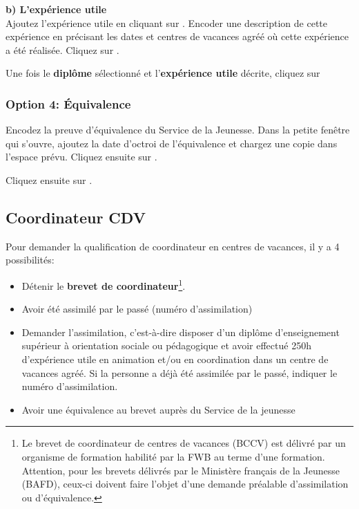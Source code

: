 \textbf{b) L'expérience utile}
\\Ajoutez l'expérience utile en cliquant sur . Encoder une description de cette expérience en précisant les dates et centres de vacances agréé où cette expérience a été réalisée. Cliquez sur . 

\vspace{0.4cm}
Une fois le \textbf{diplôme} sélectionné et l'\textbf{expérience utile} décrite, cliquez sur 
  
  
\subsubsection{Option 4: Équivalence}\label{équivalence_cdv}
Encodez la preuve d'équivalence du Service de la Jeunesse. Dans la petite fenêtre qui s'ouvre, ajoutez la date d'octroi de l'équivalence et chargez une copie dans l'espace prévu. Cliquez ensuite sur . 

Cliquez ensuite sur . 


\subsection{Coordinateur CDV} \label{ssec:coordinateur_cdv}
Pour demander la qualification de coordinateur en centres de vacances, il y a 4 possibilités:
\begin{itemize}
    \item Détenir le \textbf{brevet de coordinateur}\footnote{Le brevet de coordinateur de centres de vacances (BCCV) est délivré par un organisme de formation habilité par la FWB au terme d'une formation. Attention, pour les brevets délivrés par le Ministère français de la Jeunesse (BAFD), ceux-ci doivent faire l’objet d’une demande préalable d’assimilation ou d'équivalence.
}.
    \item Avoir été assimilé par le passé (numéro d'assimilation)
    \item Demander l'assimilation, c'est-à-dire disposer d'un diplôme d'enseignement supérieur à orientation sociale ou pédagogique et avoir effectué 250h d'expérience utile en animation et/ou en coordination dans un centre de vacances agréé. Si la personne a déjà été assimilée par le passé, indiquer le numéro d'assimilation.
    \item Avoir une équivalence au brevet auprès du Service de la jeunesse\up{\ref{note:equivalence_cdv}}
\end{itemize}





